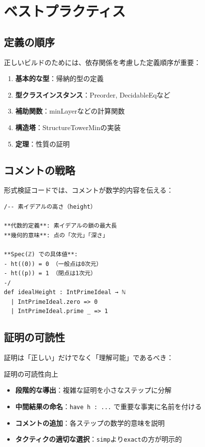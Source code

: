 \documentclass{ltjsarticle}
\begin{document}
\section{ベストプラクティス}

\subsection{定義の順序}

正しいビルドのためには、依存関係を考慮した定義順序が重要：

\begin{enumerate}
\item \textbf{基本的な型}：帰納的型の定義
\item \textbf{型クラスインスタンス}：Preorder, DecidableEqなど
\item \textbf{補助関数}：minLayerなどの計算関数
\item \textbf{構造塔}：StructureTowerMinの実装
\item \textbf{定理}：性質の証明
\end{enumerate}

\subsection{コメントの戦略}

形式検証コードでは、コメントが数学的内容を伝える：

\begin{lstlisting}[caption=効果的なコメント]
/-- 素イデアルの高さ（height）

**代数的定義**: 素イデアルの鎖の最大長
**幾何的意味**: 点の「次元」「深さ」

**Spec(ℤ) での具体値**:
- ht((0)) = 0 （一般点は0次元）
- ht((p)) = 1 （閉点は1次元）
-/
def idealHeight : IntPrimeIdeal → ℕ
  | IntPrimeIdeal.zero => 0
  | IntPrimeIdeal.prime _ => 1
\end{lstlisting}

\subsection{証明の可読性}

証明は「正しい」だけでなく「理解可能」であるべき：

\begin{tipbox}{証明の可読性向上}
\begin{itemize}
\item \textbf{段階的な導出}：複雑な証明を小さなステップに分解
\item \textbf{中間結果の命名}：\texttt{have h : ...} で重要な事実に名前を付ける
\item \textbf{コメントの追加}：各ステップの数学的意味を説明
\item \textbf{タクティクの適切な選択}：\texttt{simp}より\texttt{exact}の方が明示的
\end{itemize}
\end{tipbox}
\end{document}
